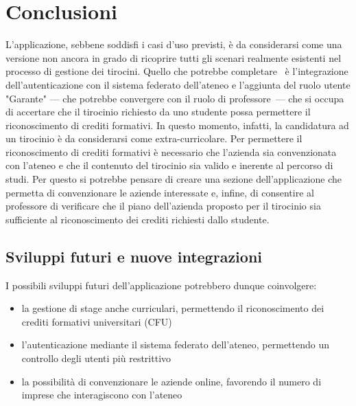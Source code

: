 \chapter{Conclusioni}

L'applicazione, sebbene soddisfi i casi d'uso previsti, è da considerarsi come una versione non ancora in grado di ricoprire tutti gli scenari realmente esistenti nel processo di gestione dei tirocini. Quello che potrebbe completare \projectName~è l'integrazione dell'autenticazione con il sistema federato dell'ateneo e l'aggiunta del ruolo utente "Garante"  --- che potrebbe convergere con il ruolo di professore~--- che si occupa di accertare che il tirocinio richiesto da uno studente possa permettere il riconoscimento di crediti formativi. In questo momento, infatti, la candidatura ad un tirocinio è da considerarsi come extra-curricolare. 
%
Per permettere il riconoscimento di crediti formativi è necessario che l'azienda sia convenzionata con l'ateneo e che il contenuto del tirocinio sia valido e inerente al percorso di studi. Per questo si potrebbe pensare di creare una sezione dell'applicazione che permetta di convenzionare le aziende interessate e, infine, di consentire al professore di verificare che il piano dell'azienda proposto per il tirocinio sia sufficiente al riconoscimento dei crediti richiesti dallo studente.

\section{Sviluppi futuri e nuove integrazioni}
I possibili sviluppi futuri dell'applicazione potrebbero dunque coinvolgere:
\begin{itemize}
	\item la gestione di stage anche curriculari, permettendo il riconoscimento dei crediti formativi universitari (CFU)
	\item l'autenticazione mediante il sistema federato dell'ateneo, permettendo un controllo degli utenti più restrittivo
	\item la possibilità di convenzionare le aziende online, favorendo il numero di imprese che interagiscono con l'ateneo
\end{itemize}
